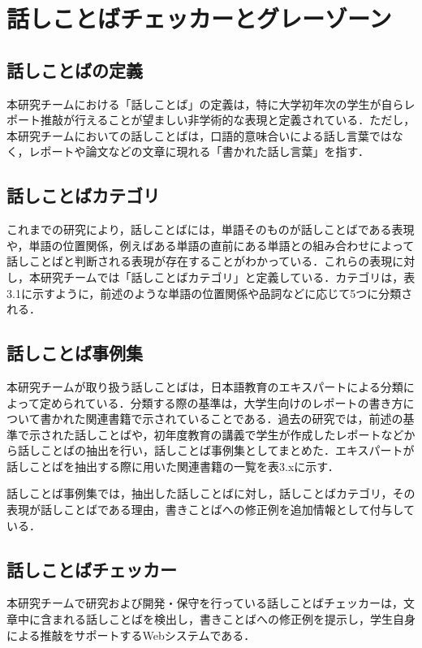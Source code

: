 \chapter{話しことばチェッカーとグレーゾーン\label{c3}}


\section{話しことばの定義 \label{c3s1}}
本研究チームにおける「話しことば」の定義は，特に大学初年次の学生が自らレポート推敲が行えることが望ましい非学術的な表現と定義されている．ただし，本研究チームにおいての話しことばは，口語的意味合いによる話し言葉ではなく，レポートや論文などの文章に現れる「書かれた話し言葉」を指す．

\section{話しことばカテゴリ \label{c3s2}}
これまでの研究により，話しことばには，単語そのものが話しことばである表現や，単語の位置関係，例えばある単語の直前にある単語との組み合わせによって話しことばと判断される表現が存在することがわかっている．これらの表現に対し，本研究チームでは「話しことばカテゴリ」と定義している．カテゴリは，表3.1に示すように，前述のような単語の位置関係や品詞などに応じて5つに分類される．



\section{話しことば事例集 \label{c3s3}}
本研究チームが取り扱う話しことばは，日本語教育のエキスパートによる分類によって定められている．分類する際の基準は，大学生向けのレポートの書き方について書かれた関連書籍で示されていることである．過去の研究では，前述の基準で示された話しことばや，初年度教育の講義で学生が作成したレポートなどから話しことばの抽出を行い，話しことば事例集としてまとめた．エキスパートが話しことばを抽出する際に用いた関連書籍の一覧を表3.xに示す．



話しことば事例集では，抽出した話しことばに対し，話しことばカテゴリ，その表現が話しことばである理由，書きことばへの修正例を追加情報として付与している．



\section{話しことばチェッカー \label{c3s4}}
本研究チームで研究および開発・保守を行っている話しことばチェッカーは，文章中に含まれる話しことばを検出し，書きことばへの修正例を提示し，学生自身による推敲をサポートするWebシステムである．

